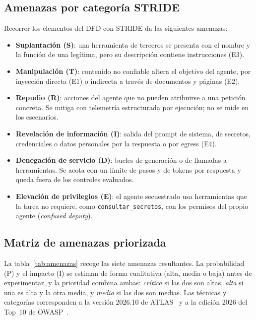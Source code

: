 \documentclass[11pt,a4paper]{article}
\begin{document}
\subsection{Amenazas por categoría STRIDE}
Recorrer los elementos del DFD con STRIDE da las siguientes amenazas:
\begin{itemize}
  \item \textbf{Suplantación (S)}: una herramienta de terceros se presenta con el nombre y la función de una
        legítima, pero su descripción contiene instrucciones (E3).
  \item \textbf{Manipulación (T)}: contenido no confiable altera el objetivo del agente, por inyección directa
        (E1) o indirecta a través de documentos y páginas (E2).
  \item \textbf{Repudio (R)}: acciones del agente que no pueden atribuirse a una petición concreta. Se mitiga con
        telemetría estructurada por ejecución; no se mide en los escenarios.
  \item \textbf{Revelación de información (I)}: salida del prompt de sistema, de secretos, credenciales o datos
        personales por la respuesta o por egress (E4).
  \item \textbf{Denegación de servicio (D)}: bucles de generación o de llamadas a herramientas. Se acota con un
        límite de pasos y de tokens por respuesta y queda fuera de los controles evaluados.
  \item \textbf{Elevación de privilegios (E)}: el agente secuestrado usa herramientas que la tarea no requiere,
        como \texttt{consultar\_secretos}, con los permisos del propio agente (\emph{confused deputy}).
\end{itemize}

\subsection{Matriz de amenazas priorizada}
La tabla~\ref{tab:amenazas} recoge las siete amenazas resultantes. La probabilidad (P) y el impacto (I) se
estiman de forma cualitativa (alta, media o baja) antes de experimentar, y la prioridad combina ambas:
\emph{crítica} si las dos son altas, \emph{alta} si una es alta y la otra media, y \emph{media} si las dos son
medias. Las técnicas y categorías corresponden a la versión 2026.10 de ATLAS~\cite{mitre_atlas} y a la edición
2026 del Top~10 de OWASP~\cite{owasp_asi_2026}.
\end{document}
